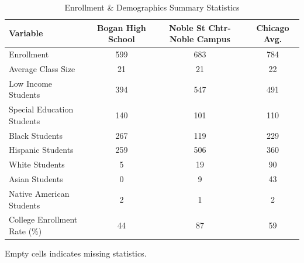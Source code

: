 \begin{table}[H]
\renewcommand{\arraystretch}{1.5}
\caption*{
{\large Enrollment \& Demographics Summary Statistics}
} 

\fontsize{10pt}{11pt}\selectfont

\begin{tabular*}{\linewidth}{@{\extracolsep{\fill}}lccc}
\toprule
Variable & Bogan High School & Noble St Chtr-Noble Campus & Chicago Avg. \\ 
\midrule\addlinespace[2.5pt]
Enrollment & 599 & 683 & 784 \\
Average Class Size & 21 & 21 & 22 \\
Low Income Students & 394 & 547 & 491 \\
Special Education Students & 140 & 101 & 110 \\
Black Students & 267 & 119 & 229 \\
Hispanic Students & 259 & 506 & 360 \\
White Students & 5 & 19 & 90 \\
Asian Students & 0 & 9 & 43 \\
Native American Students & 2 & 1 & 2 \\
College Enrollment Rate (\%) & 44 & 87 & 59 \\
\bottomrule
\end{tabular*}
\begin{minipage}{\linewidth}
Empty cells indicates missing statistics.\\
\end{minipage}
\end{table}
